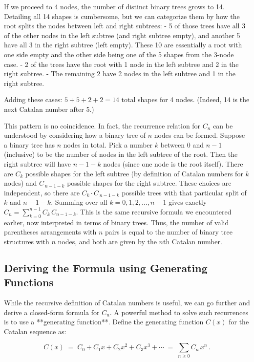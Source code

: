 \documentclass{article}
\begin{document}
If we proceed to 4 nodes, the number of distinct binary trees grows to 14. Detailing all 14 shapes is cumbersome, but we can categorize them by how the root splits the nodes between left and right subtrees:
- 5 of those trees have all 3 of the other nodes in the left subtree (and right subtree empty), and another 5 have all 3 in the right subtree (left empty). These 10 are essentially a root with one side empty and the other side being one of the 5 shapes from the 3-node case.
- 2 of the trees have the root with 1 node in the left subtree and 2 in the right subtree.
- The remaining 2 have 2 nodes in the left subtree and 1 in the right subtree.

Adding these cases: $5 + 5 + 2 + 2 = 14$ total shapes for 4 nodes. (Indeed, 14 is the next Catalan number after 5.)

This pattern is no coincidence. In fact, the recurrence relation for $C_n$ can be understood by considering how a binary tree of $n$ nodes can be formed. Suppose a binary tree has $n$ nodes in total. Pick a number $k$ between $0$ and $n-1$ (inclusive) to be the number of nodes in the left subtree of the root. Then the right subtree will have $n-1-k$ nodes (since one node is the root itself). There are $C_k$ possible shapes for the left subtree (by definition of Catalan numbers for $k$ nodes) and $C_{\,n-1-k}$ possible shapes for the right subtree. These choices are independent, so there are $C_k \cdot C_{\,n-1-k}$ possible trees with that particular split of $k$ and $n-1-k$. Summing over all $k=0,1,2,\dots,n-1$ gives exactly $C_n = \sum_{k=0}^{n-1} C_k\,C_{n-1-k}$. This is the same recursive formula we encountered earlier, now interpreted in terms of binary trees. Thus, the number of valid parentheses arrangements with $n$ pairs is equal to the number of binary tree structures with $n$ nodes, and both are given by the $n$th Catalan number.

\subsection*{Deriving the Formula using Generating Functions}

While the recursive definition of Catalan numbers is useful, we can go further and derive a closed-form formula for $C_n$. A powerful method to solve such recurrences is to use a **generating function**. Define the generating function $C(x)$ for the Catalan sequence as:

\[
C(x) \;=\; C_0 + C_1 x + C_2 x^2 + C_3 x^3 + \cdots \;=\; \sum_{n\ge 0} C_n \, x^n\,.
\]
\end{document}
